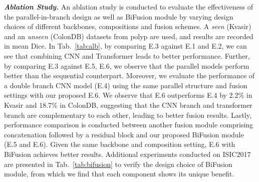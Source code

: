 \documentclass[runningheads]{llncs}
\begin{document}
\textit{\textbf{Ablation Study.}} An ablation study is conducted to evaluate the effectiveness of the parallel-in-branch design as well as BiFusion module by varying design choices of different backbones, compositions and fusion schemes. A \textit{seen} (Kvasir) and an \textit{unseen} (ColonDB) datasets from polyp are used, and results are recorded in mean Dice. In Tab.~\ref{tab:alb}, by comparing E.3 against E.1 and E.2, we can see that combining CNN and Transformer leads to better performance. Further, by comparing E.3 against E.5, E.6, we observe that the parallel models perform better than the sequential counterpart. Moreover, we evaluate the performance of a double branch CNN model (E.4) using the same parallel structure and fusion settings with our proposed E.6. We observe that E.6 outperforms E.4 by 2.2\% in Kvasir and 18.7\% in ColonDB, suggesting that the CNN branch and transformer branch are complementary to each other, leading to better fusion results. 
Lastly, performance comparison is conducted between another fusion module comprising concatenation followed by a residual block and our proposed BiFusion module (E.5 and E.6). Given the same backbone and composition setting, E.6 with BiFusion achieves better results. Additional experiments conducted on ISIC2017 are presented in Tab.~\ref{tab:bifusion} to verify the design choice of BiFusion module, from which we find that each component shows its unique benefit.
\end{document}
